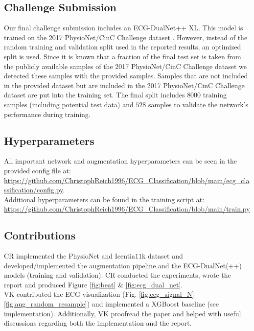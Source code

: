 \subsection{Challenge Submission} \label{subsec:challenge}

Our final challenge submission includes an ECG-DualNet++ XL. This model is trained on the 2017 PhysioNet/CinC Challenge dataset \cite{Clifford2017}. However, instead of the random training and validation split used in the reported results, an optimized split is used. Since it is known that a fraction of the final test set is taken from the publicly available samples of the 2017 PhysioNet/CinC Challenge dataset we detected these samples with the provided samples. Samples that are not included in the provided dataset but are included in the 2017 PhysioNet/CinC Challenge dataset are put into the training set. The final split includes $8000$ training samples (including potential test data) and $528$ samples to validate the network's performance during training.

\subsection{Hyperparameters}\label{subsec:hyperparameters}

All important network and augmentation hyperparameters can be seen in the provided config file at: \url{https://github.com/ChristophReich1996/ECG_Classification/blob/main/ecg_classification/config.py}.\\
Additional hyperparameters can be found in the training script at: \url{https://github.com/ChristophReich1996/ECG_Classification/blob/main/train.py}

\subsection{Contributions}
CR implemented the PhysioNet and Icentia$11$k dataset and developed/implemented the augmentation pipeline and the ECG-DualNet(++) models (training and validation). CR conducted the experiments, wrote the report and produced Figure \ref{fig:beat} \& \ref{fig:ecg_dual_net}.\\
VK contributed the ECG visualization (Fig. \ref{fig:ecg_signal_N} - \ref{fig:aug_random_resample}) and implemented a XGBoost baseline (see implementation). Additionally, VK proofread the paper and helped with useful discussions regarding both the implementation and the report.